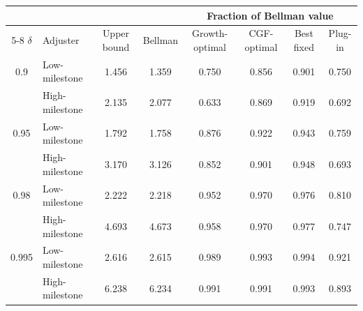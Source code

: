 \begin{tabular}{clcccccc}
\hline
 & & & & \multicolumn{4}{c}{Fraction of Bellman value} \\
\cline{5-8}
$\delta$ & Adjuster & Upper bound & Bellman & Growth-optimal & CGF-optimal & Best fixed & Plug-in \\
\hline
0.9 & Low-milestone & 1.456 & 1.359 & 0.750 & 0.856 & 0.901 & 0.750 \\
 & High-milestone & 2.135 & 2.077 & 0.633 & 0.869 & 0.919 & 0.692 \\
0.95 & Low-milestone & 1.792 & 1.758 & 0.876 & 0.922 & 0.943 & 0.759 \\
 & High-milestone & 3.170 & 3.126 & 0.852 & 0.901 & 0.948 & 0.693 \\
0.98 & Low-milestone & 2.222 & 2.218 & 0.952 & 0.970 & 0.976 & 0.810 \\
 & High-milestone & 4.693 & 4.673 & 0.958 & 0.970 & 0.977 & 0.747 \\
0.995 & Low-milestone & 2.616 & 2.615 & 0.989 & 0.993 & 0.994 & 0.921 \\
 & High-milestone & 6.238 & 6.234 & 0.991 & 0.991 & 0.993 & 0.893 \\
\hline
\end{tabular}
